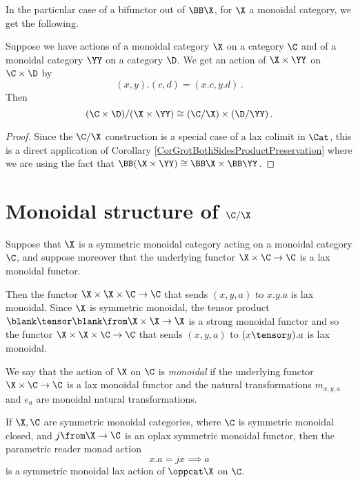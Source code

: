 In the particular case of a bifunctor out of $\BB\X$, for $\X$ a monoidal category, we get the following.

\begin{corollary}
  Suppose we have actions of a monoidal category $\X$ on a category $\C$ and of a monoidal category $\YY$ on a category $\D$.
  We get an action of $\X\times\YY$ on $\C\times \D$ by
  \[
    (x,y).(c,d) = (x.c,y.d)\,.
    \]
  Then
  \[
    (\C\times\D)/(\X\times\YY)\cong (\C/\X) \times (\D/\YY)\,.
    \]
  \label{CorQuotProductPreservation}
\end{corollary}
\begin{proof}
  Since the $\C/\X$ construction is a special case of a lax colimit in $\Cat$, this is a direct application of Corollary \ref{CorGrotBothSidesProductPreservation} where we are using the fact that $\BB(\X\times\YY)\cong \BB\X \times \BB\YY$.
\end{proof}

\section{Monoidal structure of $\C/\X$}

\begin{definition}
  Suppose that $\X$ is a symmetric monoidal category acting on a monoidal category $\C$, and suppose moreover that the underlying functor $\X\times\C \to \C$ is a lax monoidal functor.  
  
  Then the functor $\X\times\X\times\C\to \C$ that sends $(x,y,a)$ to $x.y.a$ is lax monoidal.  
  Since $\X$ is symmetric monoidal, the tensor product $\blank\tensor\blank\from \X \times\X \to \X$ is a strong monoidal functor and so the functor $\X \times \X \times \C \to \C$ that sends $(x,y,a)$ to $(x\tensor y).a$ is lax monoidal.

  We say that the action of $\X$ on $\C$ is \emph{monoidal} if the underlying functor $\X \times \C \to \C$ is a lax monoidal functor and the natural transformations $m_{x,y,a}$ and $e_a$ are monoidal natural transformations.
  \label{DefMonoidalLaxAction}
\end{definition}

\begin{example}
  If $\X,\C$ are symmetric monoidal categories, where $\C$ is symmetric monoidal closed, and $j\from \X \to \C$ is an oplax symmetric monoidal functor, then the parametric reader monad action
  \[
    x.a = jx\implies a
    \]
  is a symmetric monoidal lax action of $\oppcat\X$ on $\C$.
\end{example}


